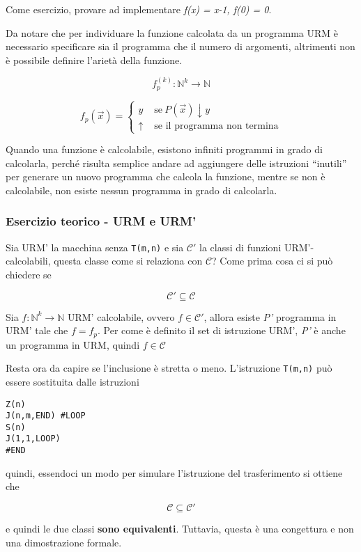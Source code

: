Come esercizio, provare ad implementare \emph{f(x) = x-1, f(0) = 0}.

Da notare che per individuare la funzione calcolata da un programma URM è necessario specificare sia il programma che il numero di argomenti, altrimenti non è possibile definire l'arietà della funzione.

$$
f_{p}^{(k)} : \mathbb{N}^k \rightarrow \mathbb{N}
$$

$$
f_p(\vec{x}) = 
\begin{cases}
y &\text{ se} \: P(\vec{x})\downarrow y \\
\uparrow &\text{ se il programma non termina}
\end{cases}
$$

Quando una funzione è calcolabile, esistono infiniti programmi in grado di calcolarla, perché risulta semplice andare ad aggiungere delle istruzioni ``inutili'' per generare un nuovo programma che calcola la funzione, mentre se non è calcolabile, non esiste nessun programma in grado di calcolarla.

\subsubsection{Esercizio teorico - URM e URM'}\label{esercizio-teorico---urm-e-urm}

Sia URM' la macchina senza \texttt{T(m,n)} e sia $\mathcal{C}'$ la classi di funzioni URM'-calcolabili, questa classe come si relaziona con $\mathcal{C}$?
Come prima cosa ci si può chiedere se

$$ \mathcal{C}' \subseteq \mathcal{C} $$

Sia $ f: \mathbb{N}^k \rightarrow \mathbb{N}$ URM' calcolabile, ovvero $ f \in \mathcal{C}' $, allora esiste \emph{P'} programma in URM' tale che $f = f_p$.
Per come è definito il set di istruzione URM', \emph{P'} è anche un programma in URM, quindi $f \in \mathcal{C}$

Resta ora da capire se l'inclusione è stretta o meno. L'istruzione \texttt{T(m,n)} può essere sostituita dalle istruzioni

\begin{lstlisting}[language=URM]
Z(n)
J(n,m,END) #LOOP
S(n)
J(1,1,LOOP)
#END
\end{lstlisting}

quindi, essendoci un modo per simulare l'istruzione del trasferimento si ottiene che

$$
\mathcal{C} \subseteq \mathcal{C}'
$$

e quindi le due classi \textbf{sono equivalenti}. 
Tuttavia, questa è una congettura e non una dimostrazione formale.

